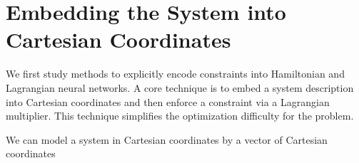 \documentclass[book.tex]{subfiles}
\begin{document}

\section{Embedding the System into Cartesian Coordinates}

We first study methods to explicitly encode constraints into Hamiltonian and Lagrangian neural networks. A core technique is to embed a system description into Cartesian coordinates and then enforce a constraint via a Lagrangian multiplier. This technique simplifies the optimization difficulty for the problem.


We can model a system in Cartesian coordinates by a vector of Cartesian coordinates
\end{document}
